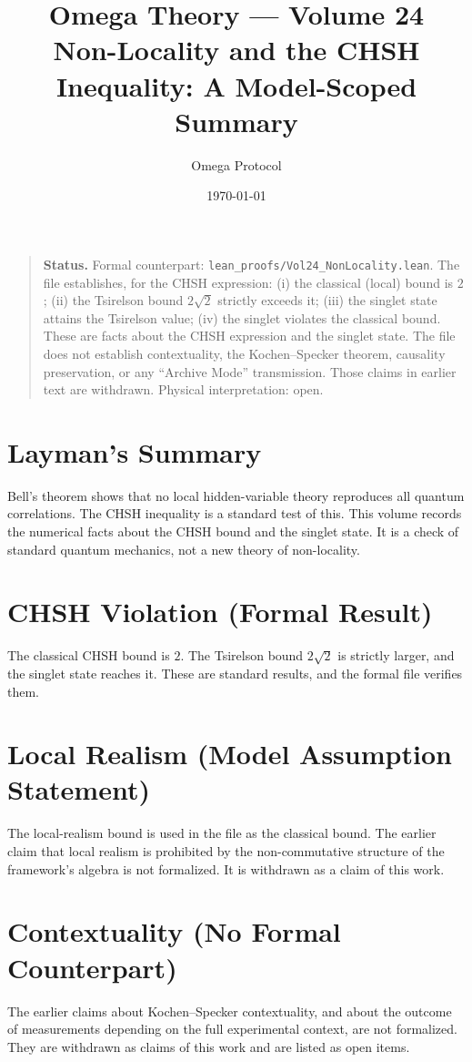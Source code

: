 \documentclass[11pt, a4paper]{article}
\title{Omega Theory --- Volume 24\\\Large Non-Locality and the CHSH Inequality: A Model-Scoped Summary}
\author{Omega Protocol}
\date{\today}
\begin{document}
\maketitle

\begin{quote}
\textbf{Status.} Formal counterpart: \texttt{lean\_proofs/Vol24\_NonLocality.lean}. The file establishes, for the CHSH expression: (i) the classical (local) bound is $2$; (ii) the Tsirelson bound $2\sqrt{2}$ strictly exceeds it; (iii) the singlet state attains the Tsirelson value; (iv) the singlet violates the classical bound. These are facts about the CHSH expression and the singlet state. The file does not establish contextuality, the Kochen--Specker theorem, causality preservation, or any ``Archive Mode'' transmission. Those claims in earlier text are withdrawn. Physical interpretation: open.
\end{quote}

\section*{Layman's Summary}
Bell's theorem shows that no local hidden-variable theory reproduces all quantum correlations. The CHSH inequality is a standard test of this. This volume records the numerical facts about the CHSH bound and the singlet state. It is a check of standard quantum mechanics, not a new theory of non-locality.

\section{CHSH Violation (Formal Result)}
The classical CHSH bound is $2$. The Tsirelson bound $2\sqrt{2}$ is strictly larger, and the singlet state reaches it. These are standard results, and the formal file verifies them.

\section{Local Realism (Model Assumption Statement)}
The local-realism bound is used in the file as the classical bound. The earlier claim that local realism is prohibited by the non-commutative structure of the framework's algebra is not formalized. It is withdrawn as a claim of this work.

\section{Contextuality (No Formal Counterpart)}
The earlier claims about Kochen--Specker contextuality, and about the outcome of measurements depending on the full experimental context, are not formalized. They are withdrawn as claims of this work and are listed as open items.
\end{document}
